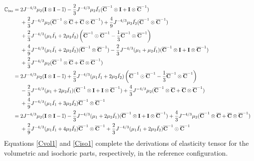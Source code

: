 \begin{equation} \label{Ciso1}
\begin{split}
\mathbb{C}_\mathrm{iso} 
= {} & 
2{J}^{-4/3}\mu_2(\bold{I} \otimes \bold{I} - \mathbb{I}) - \frac{2}{3}J^{-4/3}\mu_2\bar{I_1}({\overline{\bold{C}}}^{-1} \otimes \bold{I} + \bold{I} \otimes {\overline{\bold{C}}}^{-1}) \\
&+
\frac{2}{3}J^{-4/3}\mu_2({\overline{\bold{C}}}^{-1} \otimes {\overline{\bold{C}}} + {\overline{\bold{C}}} \otimes {\overline{\bold{C}}}^{-1}) + \frac{4}{9}J^{-4/3}\mu_2\bar{I_2}({\overline{\bold{C}}}^{-1} \otimes {\overline{\bold{C}}}^{-1}) \\
&+
\frac{2}{3}J^{-4/3}(\mu_1\bar{I_1} + 2\mu_2\bar{I_2}) \left ({\overline{\bold{C}}}^{-1} \odot {{\overline{\bold{C}}}}^{-1} - \frac{1}{3}{{\overline{\bold{C}}}}^{-1} \otimes {\overline{{\bold{C}}}}^{-1} \right) \\
&+
\frac{4}{9}J^{-4/3} (\mu_1\bar{I_1} + 2\mu_2\bar{I_2})({\overline{\bold{C}}}^{-1} \otimes {\overline{\bold{C}}}^{-1}) - \frac{2}{3}J^{-4/3}(\mu_1+\mu_2\bar{I_1})({\overline{\bold{C}}}^{-1} \otimes \bold{I} + \bold{I} \otimes {\overline{\bold{C}}}^{-1})\\
&+ \frac{2}{3}J^{-4/3}\mu_2({\overline{\bold{C}}}^{-1} \otimes {\overline{\bold{C}}}+{\overline{\bold{C}}} \otimes {\overline{\bold{C}}}^{-1})  \\
= {} &
2{J}^{-4/3}\mu_2(\bold{I} \otimes \bold{I} - \mathbb{I}) + \frac{2}{3}J^{-4/3}(\mu_1\bar{I_1} + 2\mu_2\bar{I_2})\left({\overline{\bold{C}}}^{-1} \odot {\overline{\bold{C}}}^{-1} - \frac{1}{3}{\overline{\bold{C}}}^{-1} \otimes {\overline{\bold{C}}}^{-1}\right) \\
&-
\frac{2}{3}J^{-4/3}(\mu_1 + 2\mu_2\bar{I_1})({\overline{\bold{C}}}^{-1} \otimes \bold{I} + \bold{I} \otimes {\overline{\bold{C}}}^{-1}) + \frac{4}{3}J^{-4/3}\mu_2({\overline{\bold{C}}}^{-1} \otimes {\overline{\bold{C}}} + {\overline{\bold{C}}} \otimes {\overline{\bold{C}}}^{-1}) \\
&+
\frac{4}{9}J^{-4/3}(\mu_1\bar{I_1} + 3\mu_2\bar{I_2}){\overline{\bold{C}}}^{-1} \otimes {\overline{\bold{C}}}^{-1} \\
= {} &
2{J}^{-4/3}\mu_2(\bold{I} \otimes \bold{I} - \mathbb{I}) - \frac{2}{3}J^{-4/3}(\mu_1 + 2\mu_2\bar{I_1})({\overline{\bold{C}}}^{-1} \otimes \bold{I} + \bold{I} \otimes {\overline{\bold{C}}}^{-1}) + \frac{4}{3}J^{-4/3}\mu_2({\overline{\bold{C}}}^{-1} \otimes {\overline{\bold{C}}} + {\overline{\bold{C}}} \otimes {\overline{\bold{C}}}^{-1}) \\
&+
\frac{2}{9}J^{-4/3}(\mu_1\bar{I_1} + 4\mu_2\bar{I_2}) {\overline{\bold{C}}}^{-1} \otimes {\overline{\bold{C}}}^{-1} + \frac{2}{3}J^{-4/3}(\mu_1\bar{I_1} + 2\mu_2\bar{I_2}){\overline{\bold{C}}}^{-1} \odot {\overline{\bold{C}}}^{-1} 
\end{split}
\end{equation} 
Equations \ref{Cvol1} and \ref{Ciso1} complete the derivations of elasticity tensor for the volumetric and isochoric parts, respectively, in the reference configuration.

